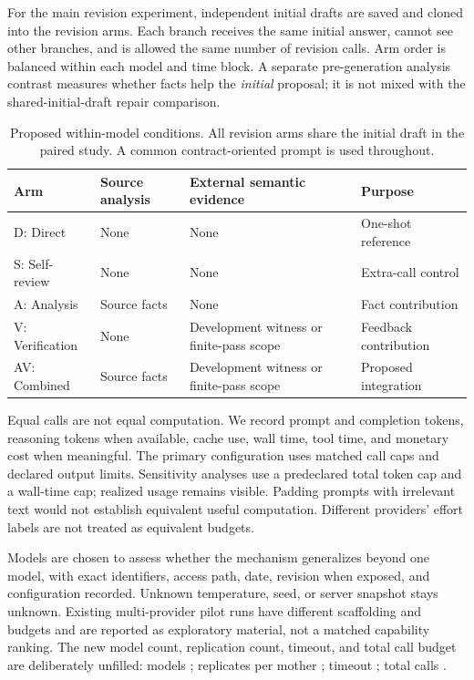 For the main revision experiment, independent initial drafts are saved and cloned
into the revision arms. Each branch receives the same initial answer, cannot see
other branches, and is allowed the same number of revision calls. Arm order is
balanced within each model and time block. A separate pre-generation analysis
contrast measures whether facts help the \emph{initial} proposal; it is not mixed
with the shared-initial-draft repair comparison.

\begin{table}[tb]
\caption{Proposed within-model conditions. All revision arms share the initial
draft in the paired study. A common contract-oriented prompt is used throughout.}
\label{tab:arms}
\begin{tabularx}{\linewidth}{lYYY}
\toprule
Arm & Source analysis & External semantic evidence & Purpose \\
\midrule
D: Direct & None & None & One-shot reference \\
S: Self-review & None & None & Extra-call control \\
A: Analysis & Source facts & None & Fact contribution \\
V: Verification & None & Development witness or finite-pass scope & Feedback contribution \\
AV: Combined & Source facts & Development witness or finite-pass scope & Proposed integration \\
\bottomrule
\end{tabularx}
\end{table}

Equal calls are not equal computation. We record prompt and completion tokens,
reasoning tokens when available, cache use, wall time, tool time, and monetary cost
when meaningful. The primary configuration uses matched call caps and declared
output limits. Sensitivity analyses use a predeclared total token cap and a wall-time
cap; realized usage remains visible. Padding prompts with irrelevant text would
not establish equivalent useful computation. Different providers' effort labels
are not treated as equivalent budgets.

Models are chosen to assess whether the mechanism generalizes beyond one model,
with exact identifiers, access path, date, revision when exposed, and configuration
recorded. Unknown temperature, seed, or server snapshot stays unknown. Existing
multi-provider pilot runs have different scaffolding and budgets and are reported
as exploratory material, not a matched capability ranking. The new model count,
replication count, timeout, and total call budget are deliberately unfilled:
models \field; replicates per mother \field; timeout \field; total calls \field.

